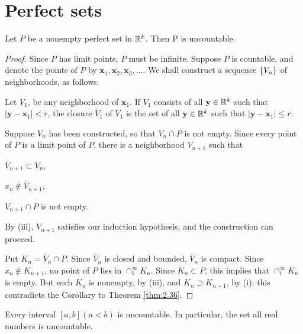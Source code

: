 \section{Perfect sets}

\begin{thm}\label{thm:2.43}
    Let $P$ be a nonempty perfect set in ${\protect\mathbb R}^k$. Then P is uncountable.    
\end{thm}
\begin{proof}
    Since $P$ has limit points, $P$ must be infinite. 
    Suppose $P$ is countable, and denote the points of $P$ by $\mathbf{x}_{1}, \mathbf{x}_{2}, \mathbf{x}_{3},\dots$. 
    We shall construct a sequence $\protect\{V_n\}$ of neighborhoods, as follows.
    
    Let $V_{1}$, be any neighborhood of $\mathbf{x}_1$. 
    If $V_{1}$ consists of all $\mathbf{y} \in {\protect\mathbb R}^k$ 
    such that $\left| \mathbf{y} - \mathbf{x}_1 \right| < r$, 
    the closure $\bar{V}_{1}$ of $V_1$ is the set of all $\mathbf{y} \in {\protect\mathbb R}^k$ 
    such that $\left| \mathbf{y} - \mathbf{x}_1 \right| \leq r$.

    Suppose $V_n$ has been constructed, 
    so that $V_n \cap P$ is not empty. 
    Since every point of $P$ is a limit point of $P$, 
    there is a neighborhood $V_{n+1}$ such that 
    \begin{inparaenum}[(i)]
        \item $\bar{V}_{n+1} \subset V_n$,
        \item $x_n \not\in \bar{V}_{n+1}$,
        \item $V_{n+1} \cap P$ is not empty. 
    \end{inparaenum}
    By (iii), $V_{n+1}$ satisfies our induction hypothesis, 
    and the construction can proceed.
    
    Put $K_n = \bar{V}_n \cap P$. 
    Since $\bar{V}_n$ is closed and bounded, 
    $\bar{V}_n$ is compact.
    Since $x_n \not\in K_{n+1}$, 
    no point of $P$ lies in $\cap_1^{\infty} K_n$.
    Since $K_n \subset P$, 
    this implies that $\cap_1^{\infty} K_n$ is empty. 
    But each $K_n$ is nonempty, 
    by (iii), and $K_n \supset K_{n+1}$,
    by (i); this contradicts the Corollary to Theorem \ref{thm:2.36}.
\end{proof}

\begin{myCorollary*}
	Every interval $[a, b] (a <b)$ is uncountable. In particular, the set
	all real numbers is uncountable.
\end{myCorollary*}


